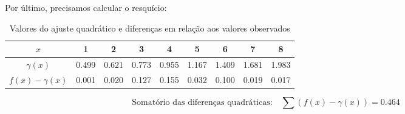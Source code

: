 \documentclass{article}
\begin{document}
Por último, precisamos calcular o resquício:
\begin{table}[h!]
    \centering
    \caption{Valores do ajuste quadrático e diferenças em relação aos valores observados}
    \begin{tabular}{ccccccccc}
        \hline
        \multicolumn{1}{c|}{$x$} & 1 & 2 & 3 & 4 & 5 & 6 & 7 & 8 \\ \hline
        $\gamma(x)$ & 0.499 & 0.621 & 0.773 & 0.955 & 1.167 & 1.409 & 1.681 & 1.983 \\
        $f(x) - \gamma(x)$ & 0.001 & 0.020 & 0.127 & 0.155 & 0.032 & 0.100 & 0.019 & 0.017 \\ \hline
    \end{tabular}
    \label{tab:ajuste_quadratico}
\end{table}
\[
\text{Somatório das diferenças quadráticas:} \quad \sum (f(x) - \gamma(x)) = 0.464
\]
\end{document}
